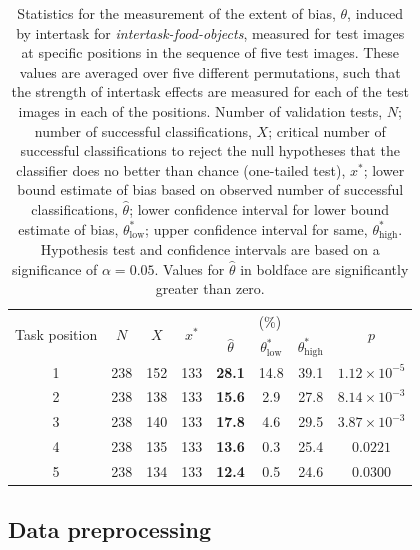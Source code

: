 \documentclass[12pt]{article}
\begin{document}
\begin{table}
\begin{center}
\begin{tabular}{c c c c c c c c }
	\toprule
	\multirow{2}{*}{Task position} & \multirow{2}{*}{$N$} & 
	\multirow{2}{*}{$X$} & \multirow{2}{*}{$x^*$} & \multicolumn{3}{c}{(\%)}
		& \multirow{2}{*}{$p$}\\ \cline{5-7}\noalign{\smallskip}
	& & & & $\hat{\theta}$ & $\theta^*_\mathrm{low}$ 
		& $\theta^*_\mathrm{high}$  \\
	\midrule
	1 & 238 & 152 & 133 & \textbf{28.1} & 14.8 & 39.1 
		& $1.12 \times 10^{-5}$\\
	2 & 238 & 138 & 133 & \textbf{15.6} & 2.9 & 27.8  
		& $8.14 \times 10^{-3}$\\
	3 & 238 & 140 & 133 & \textbf{17.8} & 4.6 & 29.5  
		& $3.87 \times 10^{-3}$\\
	4 & 238 & 135 & 133 & \textbf{13.6} & 0.3 & 25.4  
		& $0.0221$ \\
	5 & 238 & 134 & 133 & \textbf{12.4} & 0.5 & 24.6 & $0.0300$ \\
	\bottomrule
\end{tabular}
\caption{Statistics for the measurement of the extent of bias, $\theta$,
	induced by intertask for \textit{intertask-food-objects}, measured 
	for test images at specific positions in the sequence of five test images.
	These values are averaged over five different permutations, such that 
	the strength of intertask effects are measured for each of the test images
	in each of the positions.
	Number of validation tests, $N$; number of successful classifications, 
	$X$; critical number of successful classifications to reject the null 
	hypotheses that the classifier does no better than chance 
	(one-tailed test), $x^*$; 
	lower bound estimate of bias based on observed number of successful
	classifications, $\hat{\theta}$; lower confidence interval for lower
	bound estimate of bias, $\theta^*_\mathrm{low}$; upper confidence 
	interval for same, $\theta^*_\mathrm{high}$.  Hypothesis test and 
	confidence intervals are based on a significance of $\alpha=0.05$.
	Values for $\hat{\theta}$ in boldface are significantly greater than zero.
}
\label{table:theta_pos}
\end{center}
\end{table}





\subsection*{Data preprocessing}
\end{document}
